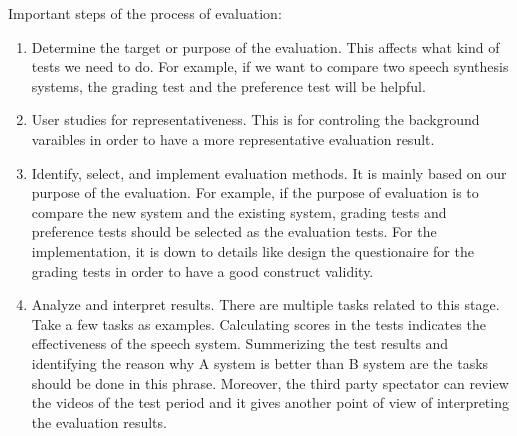 \documentclass[12pt]{article}
\newenvironment{problem}[2][Problem]{\begin{trivlist}
\item[\hskip \labelsep {\bfseries #1}\hskip \labelsep {\bfseries #2.}]}{\end{trivlist}}
\begin{document}
\begin{problem}{5.1}
    Important steps of the process of evaluation:
    \begin{enumerate}
        \item Determine the target or purpose of the evaluation. This affects what kind
        of tests we need to do. For example, if we want to compare two
        speech synthesis systems, the grading test and the preference test will
        be helpful.

        \item User studies for representativeness. This is for controling the
        background varaibles in order to have a more representative evaluation
        result.

        \item Identify, select, and implement evaluation methods.
        It is mainly based on our purpose of the evaluation. For example, if the
        purpose of evaluation is to compare the new system and the existing system,
        grading tests and preference tests should be selected as the evaluation
        tests. For the implementation, it is down to details like design the questionaire
        for the grading tests in order to have a good construct validity.

        \item  Analyze and interpret results.
        There are multiple tasks related to this stage. Take a few tasks as examples.
        Calculating scores in the tests indicates the effectiveness of the speech system.
        Summerizing the test results and identifying the reason why A system is
        better than B system are the tasks should be done in this phrase. Moreover,
        the third party spectator can review the videos of the test period and it
        gives another point of view of interpreting the evaluation results.

    \end{enumerate}
\end{problem}
\end{document}
